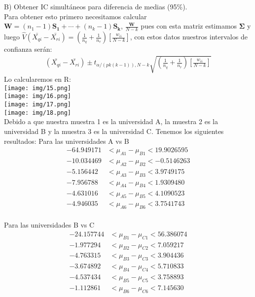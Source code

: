 \begin{sol}
\pagebreak
B) Obtener IC simultáneos para diferencia de medias (95\%).\\
Para obtener esto primero necesitamos calcular $\bm{W}=(n_1-1)\bm{S_1}+\cdots+(n_k-1)\bm{S_k}$, $\frac{\bm{W}}{N-k}$ pues con esta matriz estimamos $\bm{\Sigma}$ y luego $\hat{V}(\bar{X_{qi}}-\bar{X_{ri}})=(\frac{1}{n_q}+\frac{1}{n_r})[\frac{w_{ii}}{N-k}]$, con estos datos nuestros intervalos de confianza serán:
\begin{align*}
(\bar{X_{qi}}-\bar{X_{ri}}) \pm t_{\alpha/(pk(k-1)),N-k}\sqrt{(\frac{1}{n_q}+\frac{1}{n_r})[\frac{w_{ii}}{N-k}]}
\end{align*}
Lo calcularemos en R:\\
\texttt{[image: img/15.png]}\\
\texttt{[image: img/16.png]}\\
\texttt{[image: img/17.png]}\\
\texttt{[image: img/18.png]}\\
Debido a que nuestra muestra 1 es la universidad A, la muestra 2 es la universidad B y la muestra 3 es la universidad C. Tenemos los siguientes resultados:
Para las universidades A vs B
\begin{align*}
-64.949171 &< \mu_{A1} - \mu_{B1} < 19.9026595 \\
-10.034469 &< \mu_{A2} - \mu_{B2} < -0.5146263 \\
-5.156442 &< \mu_{A3} - \mu_{B3} < 3.9749175 \\
-7.956788 &< \mu_{A4} - \mu_{B4} < 1.9309480 \\
-4.631016 &< \mu_{A5} - \mu_{B5} < 4.1090523 \\
-4.946035 &< \mu_{A6} - \mu_{B6} < 3.7541743 \\
\end{align*}

Para las universidades B vs C
\begin{align*}
-24.157744 &< \mu_{B1} - \mu_{C1} < 56.386074 \\
-1.977294 &< \mu_{B2} - \mu_{C2} < 7.059217 \\
-4.763315 &< \mu_{B3} - \mu_{C3} < 3.904436 \\
-3.674892 &< \mu_{B4} - \mu_{C4} < 5.710833 \\
-4.537434 &< \mu_{B5} - \mu_{C5} < 3.758893 \\
-1.112861 &< \mu_{B6} - \mu_{C6} < 7.145630 \\
\end{align*}


\end{sol}
